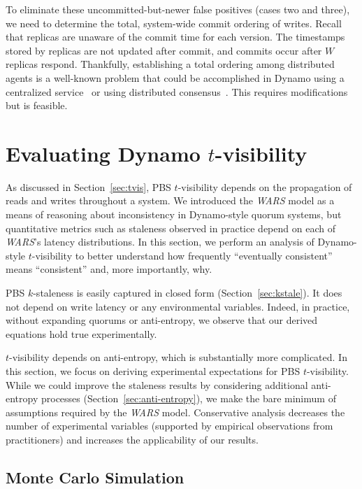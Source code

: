 \documentclass{vldb}
\newcommand{\sectionskip}{-0em}
\newcommand{\subsectionskip}{-0em}
\begin{document}
To eliminate these uncommitted-but-newer false positives (cases two
and three), we need to determine the total, system-wide commit
ordering of writes. Recall that replicas are unaware of the commit
time for each version. The timestamps stored by replicas are not
updated after commit, and commits occur after $W$ replicas
respond. Thankfully, establishing a total ordering among distributed
agents is a well-known problem that could be accomplished in Dynamo
using a centralized service~\cite{zookeeper} or using distributed
consensus~\cite{paxos}. This requires modifications but is feasible.



\vspace{\sectionskip}\section{Evaluating Dynamo {\large $t$}-visibility}
\label{sec:dynamoeval}

As discussed in Section~\ref{sec:tvis}, PBS $t$-visibility depends on
the propagation of reads and writes throughout a system.  We
introduced the \textit{WARS} model as a means of reasoning about
inconsistency in Dynamo-style quorum systems, but quantitative metrics
such as staleness observed in practice depend on each of
\textit{WARS}'s latency distributions.  In this section, we perform an
analysis of Dynamo-style $t$-visibility to better understand how
frequently ``eventually consistent'' means ``consistent'' and, more
importantly, why.

PBS $k$-staleness is easily captured in closed form
(Section~\ref{sec:kstale}).  It does not depend on write latency or
any environmental variables.  Indeed, in practice, without expanding
quorums or anti-entropy, we observe that our derived equations hold
true experimentally.

$t$-visibility depends on anti-entropy, which is substantially more
complicated.  In this section, we focus on deriving experimental
expectations for PBS $t$-visibility.  While we could improve the
staleness results by considering additional anti-entropy processes
(Section~\ref{sec:anti-entropy}), we make the bare minimum of
assumptions required by the \textit{WARS} model.  Conservative
analysis decreases the number of experimental variables (supported by
empirical observations from practitioners) and increases the
applicability of our results.

\vspace{\subsectionskip}\subsection{Monte Carlo Simulation}
\label{sec:mcsim}
\end{document}

